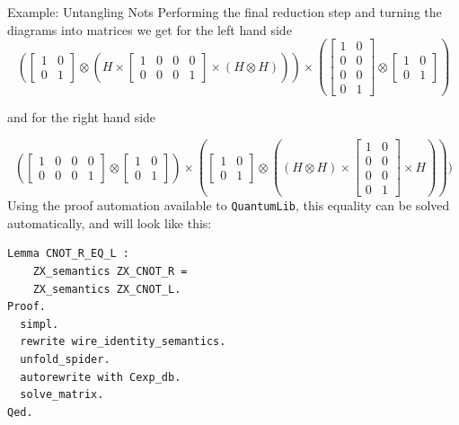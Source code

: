 \documentclass[final]{beamer}
\newlength{\colwidth}
\newcommand{\QLib}{\texttt{QuantumLib}\xspace}
\begin{document}
\begin{frame}[t, fragile]
\begin{columns}[t]
\begin{column}{\colwidth}
\begin{block}{Example: Untangling Nots}
    Performing the final reduction step and turning the diagrams into matrices we get for the left hand side
    \[
      (\begin{bmatrix} 
         1 & 0 \\ 
         0 & 1 
       \end{bmatrix} 
       \otimes 
       (H 
       \times 
       \begin{bmatrix} 
         1 & 0 & 0 & 0 \\
         0 & 0 & 0 & 1 
       \end{bmatrix} 
       \times 
       (H \otimes H)))
       \times 
      (\begin{bmatrix}
         1 & 0 \\
         0 & 0 \\
         0 & 0 \\
         0 & 1
       \end{bmatrix}
       \otimes
       \begin{bmatrix}
         1 & 0 \\
         0 & 1 
       \end{bmatrix})
     \]
     \begin{center}{ and for the right hand side }\end{center}
     \[
       (\begin{bmatrix} 
         1 & 0 & 0 & 0 \\
         0 & 0 & 0 & 1 
       \end{bmatrix} 
       \otimes
       \begin{bmatrix}
         1 & 0 \\
         0 & 1 
       \end{bmatrix})
       \times (
       \begin{bmatrix}
         1 & 0 \\
         0 & 1 
       \end{bmatrix}
       \otimes
       ( (H \otimes H) \times
       \begin{bmatrix}
         1 & 0 \\
         0 & 0 \\
         0 & 0 \\
         0 & 1
       \end{bmatrix}
       \times H))
       )
     \]
     Using the proof automation available to \QLib, this equality can be solved automatically, and will look like this:

\begin{lstlisting}
Lemma CNOT_R_EQ_L : 
    ZX_semantics ZX_CNOT_R = 
    ZX_semantics ZX_CNOT_L.
Proof.
  simpl.
  rewrite wire_identity_semantics.
  unfold_spider.
  autorewrite with Cexp_db.
  solve_matrix.
Qed.
\end{lstlisting}


\end{block}
\end{column}
\end{columns}
\end{frame}
\end{document}
